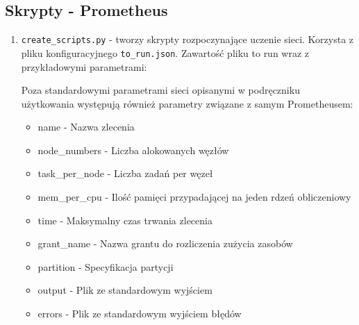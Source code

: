 \subsection{Skrypty - Prometheus}
\begin{enumerate}
	\item {\texttt{create\_scripts.py} } - 
	tworzy skrypty rozpoczynające uczenie sieci. Korzysta z pliku konfiguracyjnego \texttt{to\_run.json}.
	Zawartość pliku to run wraz z przykładowymi parametrami:
	
	\begin{import}
		[
		  {
		    "beginning": "#!/bin/sh",
		    "name": "#SBATCH -J test",
		    "node_numbers": "#SBATCH -N 1",
		    "tasks_per_node": "#SBATCH --ntasks-per-node=1",
		    "mem_per_cpu": "#SBATCH --mem-per-cpu=5GB",
		    "time": "#SBATCH --time=00:20:00",
		    "grant_name": "#SBATCH -A ap2018",
		    "partition": "#SBATCH -p plgrid",
		    "output": "#SBATCH --output=",
		    "errors": "#SBATCH --error=",
		    "hidden_size": "100",
		    "num_layers": "2",
		    "num_epochs": "5",
		    "batch_size": "40",
		    "timesteps": "50",
		    "learning_rate": "0.04",
		    "authors_size": "100",
		    "vocab_size": "48",
		    "save_path": "../results/",
		    "learning_tensors_path": "../data/dutch/tensors/known/",
		    "testing_tensors_path": "../data/dutch/tensors/known/",
		    "language": "DU"
		  }
		]
	\end{import}
	
	Poza standardowymi parametrami sieci opisanymi w podręczniku użytkowania występują również parametry
	związane z samym Prometheusem:
	\begin{itemize}
	  \item name - Nazwa zlecenia
	  \item node\_numbers - Liczba alokowanych węzłów
	  \item task\_per\_node - Liczba zadań per węzeł
	  \item mem\_per\_cpu - Ilość pamięci przypadającej na jeden rdzeń obliczeniowy
	  \item time - Maksymalny czas trwania zlecenia
	  \item grant\_name - Nazwa grantu do rozliczenia zużycia zasobów
	  \item partition - Specyfikacja partycji
	  \item output - Plik ze standardowym wyjściem
	  \item errors - Plik ze standardowym wyjściem błędów
	\end{itemize}
	

\end{enumerate}
